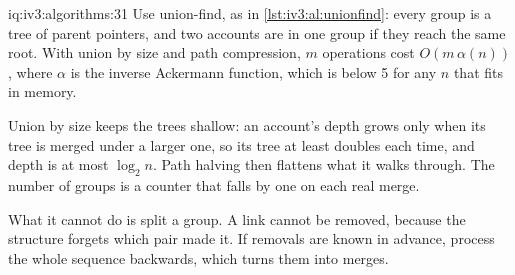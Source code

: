 \begin{solution}{iq:iv3:algorithms:31}
Use union-find, as in \cref{lst:iv3:al:unionfind}: every group is a tree of parent pointers, and two accounts are in one group if they reach the same root. With union by size and path compression, $m$ operations cost $O(m\,\alpha(n))$, where $\alpha$ is the inverse Ackermann function, which is below 5 for any $n$ that fits in memory.
\label{lst:iv3:al:unionfind}

Union by size keeps the trees shallow: an account's depth grows only when its tree is merged under a larger one, so its tree at least doubles each time, and depth is at most $\log_2 n$. Path halving then flattens what it walks through. The number of groups is a counter that falls by one on each real merge.

What it cannot do is split a group. A link cannot be removed, because the structure forgets which pair made it. If removals are known in advance, process the whole sequence backwards, which turns them into merges.

\end{solution}

